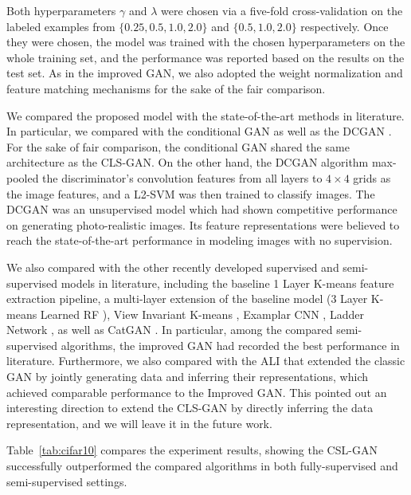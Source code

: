 \documentclass[11pt,fullpage, letterpaper,twoside]{article}
\newcommand{\1}[1]{\mathds{1}_{\left[#1\right]}}
\begin{document}
Both hyperparameters $\gamma$ and $\lambda$ were chosen via a five-fold cross-validation on the labeled examples from $\{0.25, 0.5, 1.0, 2.0\}$ and $\{0.5, 1.0, 2.0\}$ respectively. Once they were chosen, the model was trained with the chosen hyperparameters on the whole training set, and the performance was reported based on the results on the test set. As in the improved GAN, we also adopted the weight normalization and feature matching mechanisms for the sake of the fair comparison.




We compared the proposed model with the state-of-the-art methods in literature.  In particular, we compared with the conditional GAN \cite{mirza2014conditional} as well as the DCGAN \cite{radford2015unsupervised}. For the sake of fair comparison, the conditional GAN shared the same architecture as the CLS-GAN.
On the other hand, the DCGAN algorithm \cite{radford2015unsupervised} max-pooled
the discriminator's convolution features from all layers to $4\times 4$ grids as the image features, and a L2-SVM was then trained to classify images. The DCGAN was an unsupervised model which had shown competitive performance on generating photo-realistic images. Its feature representations were believed to reach the state-of-the-art performance in modeling images with no supervision.







We also compared with the other recently developed supervised and semi-supervised models in literature, including the baseline 1 Layer K-means feature extraction pipeline, a multi-layer extension of the baseline model (3 Layer K-means Learned RF \cite{coates2011selecting}), View Invariant K-means \cite{hui2013direct}, Examplar CNN \cite{dosovitskiydiscriminative}, Ladder Network \cite{rasmus2015semi}, as well as CatGAN \cite{springenberg2015unsupervised}.  In particular, among the compared semi-supervised algorithms, the improved GAN \cite{salimans2016improved} had recorded the best performance in literature.  Furthermore, we also compared with the ALI \cite{dumoulin2016adversarially} that extended the classic GAN by jointly generating data and inferring their representations, which achieved comparable performance to the Improved GAN. This pointed out an interesting direction to extend the CLS-GAN by directly inferring the data representation, and we will leave it in the future work.


Table~\ref{tab:cifar10} compares the experiment results, showing the CSL-GAN successfully outperformed the compared algorithms in both fully-supervised and semi-supervised settings.
\end{document}
